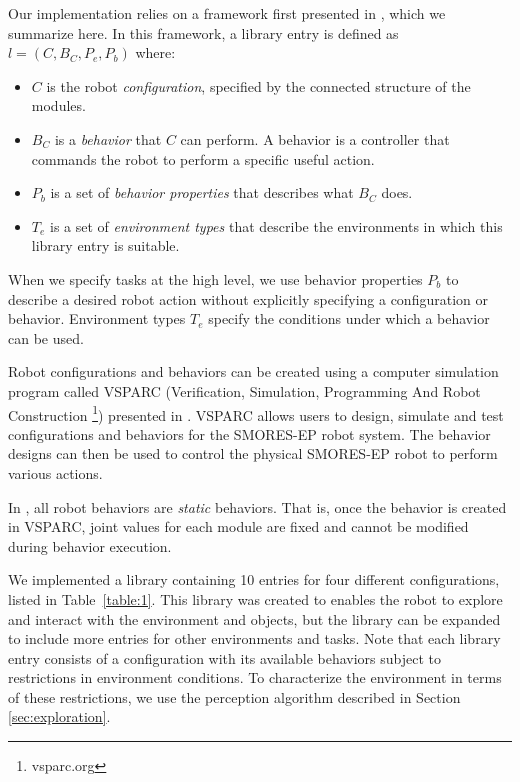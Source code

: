 \documentclass[conference]{IEEEtran}
\begin{document}
Our implementation relies on a framework first presented in \cite{Jing2016}, which we summarize here.
In this framework, a library entry is defined as $l = (C,B_C,P_e,P_b)$ where:
\begin{itemize}
\item $C$ is the robot \emph{configuration}, specified by the connected structure of the modules.
\item $B_C$ is a \emph{behavior} that $C$ can perform. A behavior is a controller that commands the robot to perform a specific useful action. 
\item $P_b$ is a set of \emph{behavior properties} that describes what $B_C$ does. 
\item $T_e$ is a set of \emph{environment types} that describe the environments in which this library entry is suitable. 
\end{itemize} 
%
When we specify tasks at the high level, we use behavior properties $P_b$ to describe a desired robot action without explicitly specifying a configuration or behavior.
Environment types $T_e$ specify the conditions under which a behavior can be used.

Robot configurations and behaviors can be created using a computer simulation program called VSPARC (Verification, Simulation, Programming And Robot Construction \footnote{vsparc.org}) presented in \cite{Jing2016}.
VSPARC allows users to design, simulate and test configurations and behaviors for the SMORES-EP robot system.
The behavior designs can then be used to control the physical SMORES-EP robot to perform various actions.

In \cite{Jing2016}, all robot behaviors are \textit{static} behaviors. That is, once the behavior is created in VSPARC, joint values for each module are fixed and cannot be modified during behavior execution.

We implemented a library containing 10 entries for four different configurations,
listed in Table~\ref{table:1}.
This library was created to enables the robot to explore and interact with the environment and objects, but the library can be expanded to include more entries for other environments and tasks. Note that each library entry consists of a configuration with its available behaviors subject to restrictions in environment conditions. To characterize the environment in terms of these restrictions, we use the perception algorithm described in Section \ref{sec:exploration}.
\end{document}
